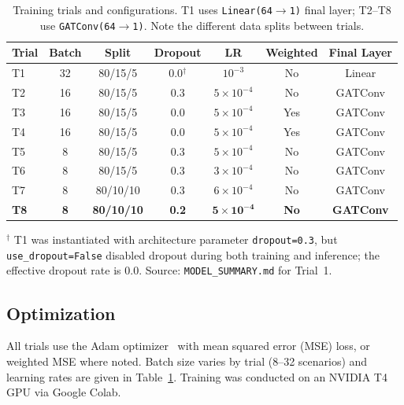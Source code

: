 \begin{table}[htbp]
\centering
\caption[Training trials and hyperparameter configurations]{Training trials and configurations. T1 uses \texttt{Linear(64$\to$1)} final layer; T2--T8 use \texttt{GATConv(64$\to$1)}. Note the different data splits between trials.}
\label{tab:trials}
\begin{tabular}{lcccccc}
\toprule
\textbf{Trial} & \textbf{Batch} & \textbf{Split} & \textbf{Dropout} & \textbf{LR} & \textbf{Weighted} & \textbf{Final Layer} \\
\midrule
T1 & 32 & 80/15/5 & 0.0$^\dagger$ & $10^{-3}$ & No & Linear \\
T2 & 16 & 80/15/5 & 0.3 & $5{\times}10^{-4}$ & No & GATConv \\
T3 & 16 & 80/15/5 & 0.0 & $5{\times}10^{-4}$ & Yes & GATConv \\
T4 & 16 & 80/15/5 & 0.0 & $5{\times}10^{-4}$ & Yes & GATConv \\
T5 & 8 & 80/15/5 & 0.3 & $5{\times}10^{-4}$ & No & GATConv \\
T6 & 8 & 80/15/5 & 0.3 & $3{\times}10^{-4}$ & No & GATConv \\
T7 & 8 & 80/10/10 & 0.3 & $6{\times}10^{-4}$ & No & GATConv \\
\textbf{T8} & \textbf{8} & \textbf{80/10/10} & \textbf{0.2} & $\mathbf{5{\times}10^{-4}}$ & \textbf{No} & \textbf{GATConv} \\
\bottomrule
\end{tabular}
\vspace{2pt}
\begin{minipage}{\linewidth}
\footnotesize $^\dagger$ T1 was instantiated with architecture parameter \texttt{dropout=0.3}, but \texttt{use\_dropout=False} disabled dropout during both training and inference; the effective dropout rate is 0.0. Source: \texttt{MODEL\_SUMMARY.md} for Trial~1.
\end{minipage}
\end{table}

\subsection{Optimization}

All trials use the Adam optimizer~\cite{kingma2015adam} with mean squared error (MSE) loss, or weighted MSE where noted. Batch size varies by trial (8--32 scenarios) and learning rates are given in Table~\ref{tab:trials}. Training was conducted on an NVIDIA T4 GPU via Google Colab.

